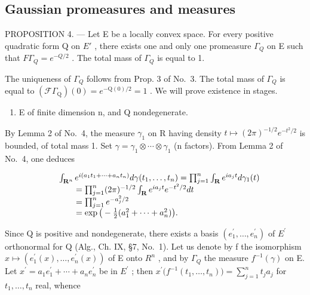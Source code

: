 \subsection{Gaussian promeasures and measures}

PROPOSITION 4. --- Let E be a locally convex space. For every positive quadratic form Q on \(E'\) , there exists one and only one promeasure \(\Gamma_{Q}\) on E such that \(F\Gamma_{Q}=e^{-Q/2}\) . The total mass of \(\Gamma_{Q}\) is equal to 1.

The uniqueness of \(\Gamma_{Q}\) follows from Prop. 3 of No.~3. The total mass of \(\Gamma_{Q}\) is equal to \((\mathcal{F}\Gamma_{\mathrm{Q}})(0)=e^{-\mathrm{Q}(0)/2}=1\) . We will prove existence in stages.

\begin{enumerate}
\def\labelenumi{\Alph{enumi})}
\tightlist
\item
  E of finite dimension n, and Q nondegenerate.
\end{enumerate}

By Lemma 2 of No.~4, the measure \(\gamma_{1}\) on R having density \(t \mapsto (2\pi)^{-1/2}e^{-t^{2}/2}\) is bounded, of total mass 1. Set \(\gamma = \gamma_{1} \otimes \cdots \otimes \gamma_{1}\) (n factors). From Lemma 2 of No.~4, one deduces

\[
\begin{array}{r l} & {\int_ {\mathbf {R} ^ {n}} e ^ {i (a _ {1} t _ {1} + \dots + a _ {n} t _ {n})} d \gamma (t _ {1}, \ldots , t _ {n}) = \prod_ {j = 1} ^ {n} \int_ {\mathbf {R}} e ^ {i a _ {j} t} d \gamma_ {1} (t)} \\ & {\qquad = \prod_ {j = 1} ^ {n} (2 \pi) ^ {- 1 / 2} \int_ {\mathbf {R}} e ^ {i a _ {j} t} e ^ {- t ^ {2} / 2} d t} \\ & {\qquad = \prod_ {j = 1} ^ {n} e ^ {- a _ {j} ^ {2} / 2}} \\ & {\qquad = \exp \big (- \frac {1}{2} (a _ {1} ^ {2} + \dots + a _ {n} ^ {2}) \big).} \end{array}
\]

Since Q is positive and nondegenerate, there exists a basis \((e_{1}^{\prime},\ldots,e_{n}^{\prime})\) of \(E^{\prime}\) orthonormal for Q (Alg., Ch. IX, §7, No.~1). Let us denote by f the isomorphism \(x\mapsto(e_{1}^{\prime}(x),\ldots,e_{n}^{\prime}(x))\) of E onto \(R^{n}\) , and by \(\Gamma_{Q}\) the measure \(f^{-1}(\gamma)\) on E. Let \(x^{\prime}=a_{1}e_{1}^{\prime}+\cdots+a_{n}e_{n}^{\prime}\) be in \(E^{\prime}\) ; then \(x^{\prime}\big(f^{-1}(t_{1},\ldots,t_{n})\big)=\sum_{j=1}^{n}t_{j}a_{j}\) for \(t_{1},\ldots,t_{n}\) real, whence


